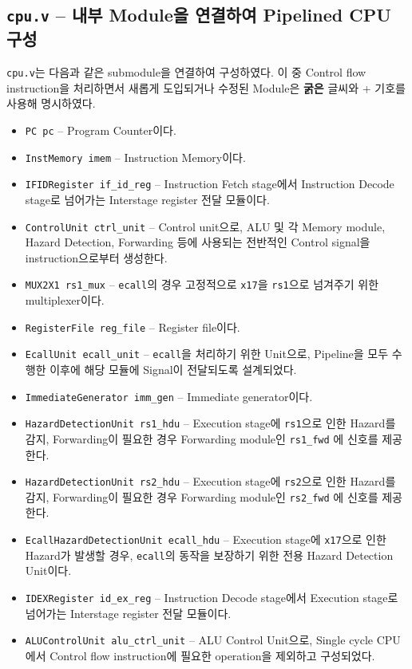 \documentclass{scrartcl}
\begin{document}
\subsection{\texttt{cpu.v} -- 내부 Module을 연결하여 Pipelined CPU 구성}
\texttt{cpu.v}는 다음과 같은 submodule을 연결하여 구성하였다.
이 중 Control flow instruction을 처리하면서 새롭게 도입되거나 수정된 Module은 \textbf{굵은} 글씨와 + 기호를 사용해 명시하였다.
\begin{itemize}
  \item \texttt{PC pc} -- Program Counter이다.
  \item \texttt{InstMemory imem} -- Instruction Memory이다.
  \item \texttt{IFIDRegister if\_id\_reg} -- Instruction Fetch stage에서 Instruction Decode stage로 넘어가는 Interstage register 전달 모듈이다.
  \item \texttt{ControlUnit ctrl\_unit} -- Control unit으로, ALU 및 각 Memory module, Hazard Detection, Forwarding 등에 사용되는 전반적인 Control signal을 instruction으로부터 생성한다.
  \item \texttt{MUX2X1 rs1\_mux} -- \texttt{ecall}의 경우 고정적으로 \texttt{x17}을 \texttt{rs1}으로 넘겨주기 위한 multiplexer이다.
  \item \texttt{RegisterFile reg\_file} -- Register file이다.
  \item \texttt{EcallUnit ecall\_unit} -- \texttt{ecall}을 처리하기 위한 Unit으로, Pipeline을 모두 수행한 이후에 해당 모듈에 Signal이 전달되도록 설계되었다.
  \item \texttt{ImmediateGenerator imm\_gen} -- Immediate generator이다.
  \item \texttt{HazardDetectionUnit rs1\_hdu} -- Execution stage에 \texttt{rs1}으로 인한 Hazard를 감지, Forwarding이 필요한 경우 Forwarding module인 \texttt{rs1\_fwd} 에 신호를 제공한다.
  \item \texttt{HazardDetectionUnit rs2\_hdu} -- Execution stage에 \texttt{rs2}으로 인한 Hazard를 감지, Forwarding이 필요한 경우 Forwarding module인 \texttt{rs2\_fwd} 에 신호를 제공한다.
  \item \texttt{EcallHazardDetectionUnit ecall\_hdu} -- Execution stage에 \texttt{x17}으로 인한 Hazard가 발생할 경우, \texttt{ecall}의 동작을 보장하기 위한 전용 Hazard Detection Unit이다.
  \item \texttt{IDEXRegister id\_ex\_reg} -- Instruction Decode stage에서 Execution stage로 넘어가는 Interstage register 전달 모듈이다.
  \item \texttt{ALUControlUnit alu\_ctrl\_unit} -- ALU Control Unit으로, Single cycle CPU에서 Control flow instruction에 필요한 operation을 제외하고 구성되었다.

\end{itemize}
\end{document}
